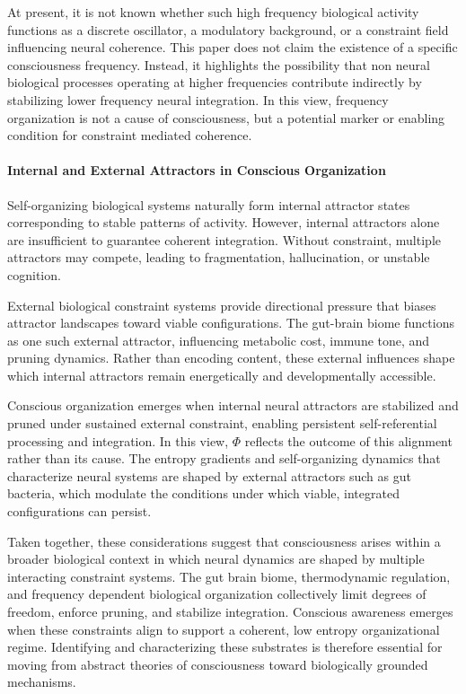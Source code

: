 \documentclass[12pt,letterpaper]{article}
\begin{document}
At present, it is not known whether such high frequency biological activity functions as a discrete oscillator, a modulatory background, or a constraint field influencing neural coherence. This paper does not claim the existence of a specific consciousness frequency. Instead, it highlights the possibility that non neural biological processes operating at higher frequencies contribute indirectly by stabilizing lower frequency neural integration. In this view, frequency organization is not a cause of consciousness, but a potential marker or enabling condition for constraint mediated coherence.

\paragraph{Internal and External Attractors in Conscious Organization}

Self-organizing biological systems naturally form internal attractor states corresponding to stable patterns of activity. However, internal attractors alone are insufficient to guarantee coherent integration. Without constraint, multiple attractors may compete, leading to fragmentation, hallucination, or unstable cognition.

External biological constraint systems provide directional pressure that biases attractor landscapes toward viable configurations. The gut-brain biome functions as one such external attractor, influencing metabolic cost, immune tone, and pruning dynamics. Rather than encoding content, these external influences shape which internal attractors remain energetically and developmentally accessible.

Conscious organization emerges when internal neural attractors are stabilized and pruned under sustained external constraint, enabling persistent self-referential processing and integration. In this view, $\Phi$ reflects the outcome of this alignment rather than its cause. The entropy gradients and self-organizing dynamics that characterize neural systems are shaped by external attractors such as gut bacteria, which modulate the conditions under which viable, integrated configurations can persist.

Taken together, these considerations suggest that consciousness arises within a broader biological context in which neural dynamics are shaped by multiple interacting constraint systems. The gut brain biome, thermodynamic regulation, and frequency dependent biological organization collectively limit degrees of freedom, enforce pruning, and stabilize integration. Conscious awareness emerges when these constraints align to support a coherent, low entropy organizational regime. Identifying and characterizing these substrates is therefore essential for moving from abstract theories of consciousness toward biologically grounded mechanisms.
\end{document}

